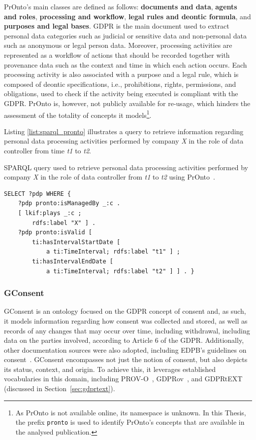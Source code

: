 PrOnto's main classes are defined as follows: \textbf{documents and data}, \textbf{agents and roles}, \textbf{processing and workflow}, \textbf{legal rules and deontic formula}, and \textbf{purposes and legal bases}.
GDPR is the main document used to extract personal data categories such as judicial or sensitive data and non-personal data such as anonymous or legal person data.
Moreover, processing activities are represented as a workflow of actions that should be recorded together with provenance data such as the context and time in which each action occurs.
Each processing activity is also associated with a purpose and a legal rule, which is composed of deontic specifications, i.e., prohibitions, rights, permissions, and obligations, used to check if the activity being executed is compliant with the GDPR. PrOnto is, however, not publicly available for re-usage, which hinders the assessment of the totality of concepts it models\footnote{As PrOnto is not available online, its namespace is unknown. In this Thesis, the prefix \texttt{pronto} is used to identify PrOnto's concepts that are available in the analysed publication.}. 

Listing \ref{list:sparql_pronto} illustrates a query to retrieve information regarding personal data processing activities performed by company \textit{X} in the role of data controller from time \textit{t1} to \textit{t2}.

\begin{listing}[ht]
\caption{SPARQL query used to retrieve personal data processing activities performed by company \textit{X} in the role of data controller from \textit{t1} to \textit{t2} using PrOnto~\citep{ko_pronto_2018}.}
\label{list:sparql_pronto}
\begin{verbatim}
SELECT ?pdp WHERE {
    ?pdp pronto:isManagedBy _:c .
    [ lkif:plays _:c ;
        rdfs:label "X" ] .
    ?pdp pronto:isValid [
        ti:hasIntervalStartDate [ 
            a ti:TimeInterval; rdfs:label "t1" ] ;
        ti:hasIntervalEndDate [ 
            a ti:TimeInterval; rdfs:label "t2" ] ] . }
\end{verbatim}
\end{listing}

\subsubsection{GConsent}
\label{sec:gconsent}

GConsent \citep{hitzler_gconsent_2019} is an ontology focused on the GDPR concept of consent and, as such, it models information regarding how consent was collected and stored, as well as records of any changes that may occur over time, including withdrawal, including data on the parties involved, according to Article 6 of the GDPR.
Additionally, other documentation sources were also adopted, including EDPB's guidelines on consent~\citep{european_data_protection_board_guidelines_2020}.
GConsent encompasses not just the notion of consent, but also depicts its status, context, and origin.
To achieve this, it leverages established vocabularies in this domain, including PROV-O~\citep{lebo_prov-o_2013}, GDPRov~\citep{pandit_modelling_2017}, and GDPRtEXT~\citep{gangemi_gdprtext_2018} (discussed in Section~\ref{sec:gdprtext}).

